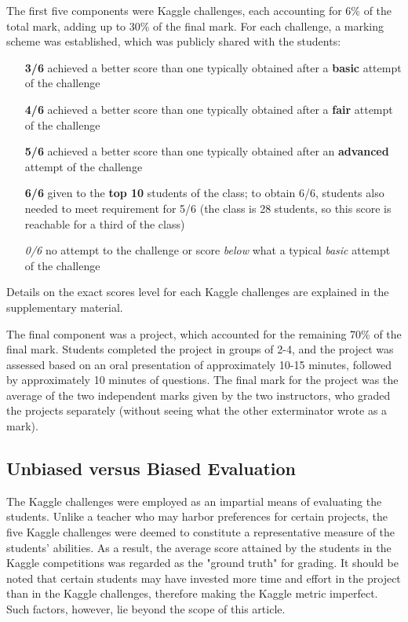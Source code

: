 \documentclass[a4paper]{article}
\begin{document}
	The first five components were Kaggle challenges, each accounting for 6\% of the total mark, adding up to 30\% of the final mark.
	For each challenge, a marking scheme was established, which was publicly shared with the students:
	\begin{itemize}
		\item [\textbf{3/6}] achieved a better score than one typically obtained after a \textbf{basic} attempt of the challenge
		\item [\textbf{4/6}] achieved a better score than one typically obtained after a \textbf{fair} attempt of the challenge
		\item [\textbf{5/6}] achieved a better score than one typically obtained after an \textbf{advanced} attempt of the challenge
		\item [\textbf{6/6}] given to the \textbf{top 10} students of the class; to obtain 6/6, students also needed to meet requirement for 5/6 (the class is 28 students, so this score is reachable for a third of the class)
		\item [\textit{0/6}] no attempt to the challenge or score \textit{below} what a typical \textit{basic} attempt of the challenge
	\end{itemize}
	Details on the exact scores level for each Kaggle challenges are explained in the supplementary material.
	
	The final component was a project, which accounted for the remaining 70\% of the final mark.
	Students completed the project in groups of 2-4, and the project was assessed based on an oral presentation of approximately 10-15 minutes, followed by approximately 10 minutes of questions.
	The final mark for the project was the average of the two independent marks given by the two instructors, who graded the projects separately (without seeing what the other exterminator wrote as a mark).
	
	\subsection{Unbiased versus Biased Evaluation}
	The Kaggle challenges were employed as an impartial means of evaluating the students.
	Unlike a teacher who may harbor preferences for certain projects, the five Kaggle challenges were deemed to constitute a representative measure of the students' abilities.
	As a result, the average score attained by the students in the Kaggle competitions was regarded as the "ground truth" for grading.
	It should be noted that certain students may have invested more time and effort in the project than in the Kaggle challenges, therefore making the Kaggle metric imperfect.
	Such factors, however, lie beyond the scope of this article.
	
\end{document}
